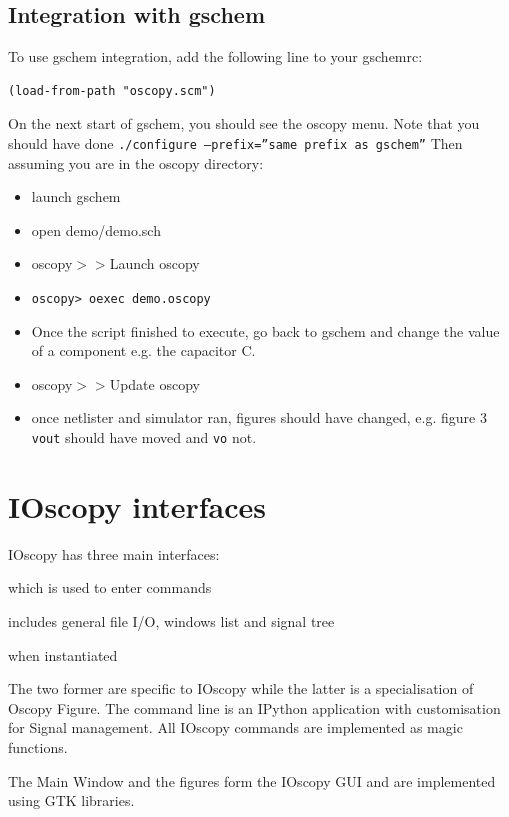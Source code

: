 \documentclass[a4paper,11pt]{report}
\renewenvironment{description}{%
\begin{basedescript}{%
\renewcommand{\makelabel}[1]{\bfseries##1}%
}%
}{%
\end{basedescript}%
}
\begin{document}
\subsection{Integration with gschem}
\label{sec:gschemint}
To use gschem integration, add the following line to your gschemrc:
\begin{lstlisting}
(load-from-path "oscopy.scm")
\end{lstlisting}
On the next start of gschem, you should see the oscopy menu. Note that you should have done \texttt{./configure --prefix=''same prefix as gschem''} Then assuming you are in the oscopy directory: 
\begin{itemize}
\item     launch gschem
\item    open demo/demo.sch
\item    oscopy$> >$Launch oscopy
\item    \lstinline!oscopy> oexec demo.oscopy!
\item    Once the script finished to execute, go back to gschem and change the value of a component e.g. the capacitor C.
\item    oscopy$> >$Update oscopy
\item    once netlister and simulator ran, figures should have changed, e.g. figure 3 \texttt{vout} should have moved and \texttt{vo} not.
\end{itemize}

\section{IOscopy interfaces}
IOscopy has three main interfaces:
\begin{description}
\item[The command line] which is used to enter commands
\item[The Main Window] includes general file I/O, windows list and signal tree
\item[The figures] when instantiated
\end{description}
The two former are specific to IOscopy while the latter is a specialisation of Oscopy Figure.
The command line is an IPython application with customisation for Signal management.
All IOscopy commands are implemented as magic functions.

The Main Window and the figures form the IOscopy GUI and are implemented using GTK libraries.
\end{document}
